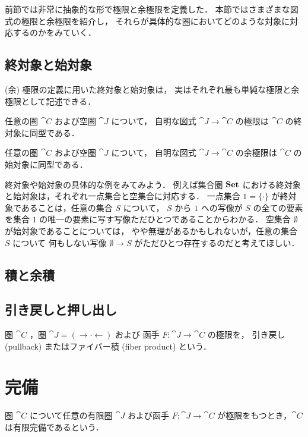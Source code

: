 \documentclass[titlepage]{ltjsreport}
\newtheorem[S]{theorem}{定理}[chapter]
\newtheorem[S]{definition}[theorem]{定義}
\newtheorem[S]{example}[theorem]{例}
\begin{document}
前節では非常に抽象的な形で極限と余極限を定義した．
本節ではさまざまな図式の極限と余極限を紹介し，
それらが具体的な圏においてどのような対象に対応するのかをみていく．

\subsection{終対象と始対象}

(余) 極限の定義に用いた終対象と始対象は，
実はそれぞれ最も単純な極限と余極限として記述できる．
\begin{theorem}[極限としての終対象]
  任意の圏 $\cat{C}$ および空圏 $\cat{J}$ について，
  自明な図式 $\cat{J}\to\cat{C}$ の極限は
  $\cat{C}$ の終対象に同型である．
\end{theorem}
\begin{theorem}[余極限としての始対象]
  任意の圏 $\cat{C}$ および空圏 $\cat{J}$ について，
  自明な図式 $\cat{J}\to\cat{C}$ の余極限は
  $\cat{C}$ の始対象に同型である．
\end{theorem}
終対象や始対象の具体的な例をみてみよう．
例えば集合圏 $\mathbf{Set}$ における終対象と始対象は，それぞれ一点集合と空集合に対応する．
一点集合 $1=\{\cdot\}$ が終対象であることは，任意の集合 $S$ について，
$S$ から $1$ への写像が $S$ の全ての要素を集合 $1$ の唯一の要素に写す写像ただひとつであることからわかる．
空集合 $\emptyset$ が始対象であることについては，
やや無理があるかもしれないが，任意の集合 $S$ について
何もしない写像 $\emptyset\to S$ がただひとつ存在するのだと考えてほしい．

\subsection{積と余積}

\subsection{引き戻しと押し出し}

\begin{definition}[引き戻し]
  圏 $\cat{C}$ ，圏 $\cat{J}=(\rightarrow\cdot\leftarrow)$ および
  函手 $F:\cat{J}\to\cat{C}$ の極限を，
  引き戻し (pullback) またはファイバー積 (fiber product) という．
\end{definition}

\section{完備}

\begin{definition}[有限完備]
  圏 $\cat{C}$ について任意の有限圏 $\cat{J}$ および函手 $F:\cat{J}\to\cat{C}$
  が極限をもつとき，$\cat{C}$ は有限完備であるという．
\end{definition}
\end{document}
